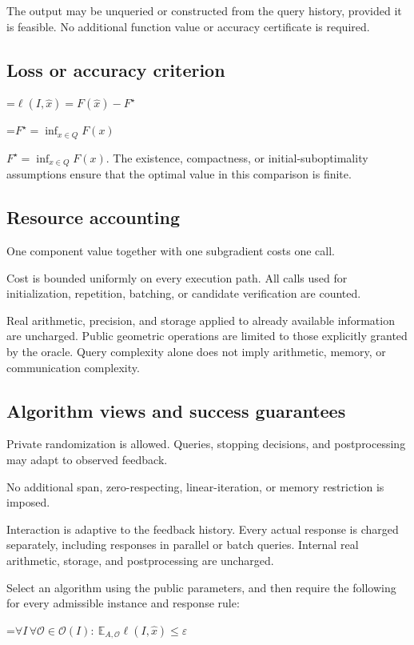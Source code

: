 \documentclass[10pt,a4paper]{article}
\newcommand{\AtlasMath}[1]{\par\begingroup\centering\setbox0=\hbox{$\displaystyle #1$}\ifdim\wd0>1.4\linewidth\typeout{ATLAS WIDE FORMULA: \the\wd0}\fi\ifdim\wd0>\linewidth\resizebox{\linewidth}{!}{\box0}\else\box0\fi\par\endgroup}
\newcommand{\AtlasInlineMath}[1]{\begingroup\setbox0=\hbox{$#1$}\ifdim\wd0>.4\linewidth\endgroup\AtlasMath{#1}\else\endgroup$#1$\fi}
\begin{document}
The output may be unqueried or constructed from the query history, provided it is feasible. No additional function value or accuracy certificate is required.

\subsection{Loss or accuracy criterion}

\AtlasMath{\ell(I,\widehat{x})=F(\widehat{x})-F^\star}


\AtlasInlineMath{F^\star=\inf_{x\in Q}F(x)}. The existence, compactness, or initial-suboptimality assumptions ensure that the optimal value in this comparison is finite.

\subsection{Resource accounting}
One component value together with one subgradient costs one call.

Cost is bounded uniformly on every execution path. All calls used for initialization, repetition, batching, or candidate verification are counted.

Real arithmetic, precision, and storage applied to already available information are uncharged. Public geometric operations are limited to those explicitly granted by the oracle. Query complexity alone does not imply arithmetic, memory, or communication complexity.

\subsection{Algorithm views and success guarantees}
Private randomization is allowed. Queries, stopping decisions, and postprocessing may adapt to observed feedback.

No additional span, zero-respecting, linear-iteration, or memory restriction is imposed.

Interaction is adaptive to the feedback history. Every actual response is charged separately, including responses in parallel or batch queries. Internal real arithmetic, storage, and postprocessing are uncharged.

Select an algorithm using the public parameters, and then require the following for every admissible instance and response rule:


\AtlasMath{\forall I\,\forall\mathcal{O}\in\mathcal{O}(I):\ \mathbb{E}_{A,\mathcal{O}}\ell(I,\widehat{x})\le\varepsilon}
\end{document}
